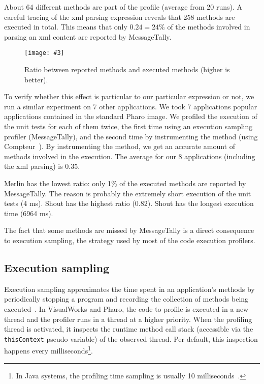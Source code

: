 \documentclass{sig-alternate}
\newcommand{\ct}{\lstinline[backgroundcolor=\color{white},basicstyle=\footnotesize\ttfamily]}
\newcommand{\fig}[4]{
	\begin{figure}[#1]
		\centering
		\texttt{[image: \#3]}
		\caption{\label{fig:#3}#4}
	\end{figure}}
\begin{document}
About 64 different methods are part of the profile (average from 20 runs). A careful tracing of the xml parsing expression reveals that 258 methods are executed in total. This means that only $0.24 = 24\%$ of the methods involved in parsing an xml content are reported by MessageTally. 

		

\fig{h}{0.5}{Ratio}{Ratio between reported methods and executed methods (higher is better).}

To verify whether this effect is particular to our particular expression or not, we run a similar experiment on 7 other applications.
We took 7 applications popular applications contained in the standard Pharo image. We profiled the execution of the unit tests for each of them twice, the first time using an execution sampling profiler (MessageTally), and the second time by instrumenting the method (using Compteur~\cite{Berg11d}).
By instrumenting the method, we get an accurate amount of methods involved in the execution. The average for our 8 applications (including the xml parsing) is 0.35. 

Merlin has the lowest ratio: only 1\% of the executed methods are reported by MessageTally. The reason is probably the extremely short execution of the unit tests (4 ms). Shout has the highest ratio (0.82). Shout has the longest execution time (6964 ms). 

The fact that some methods are missed by MessageTally is a direct consequence to execution sampling, the strategy used by most of the code execution profilers.


\subsection{Execution sampling}
Execution sampling approximates the time spent in an application's methods by periodically stopping a program and recording the collection of methods being executed~\cite{Berg11d}. In VisualWorks and Pharo, the code to profile is executed in a new thread and the profiler runs in a thread at a higher priority. 
When the profiling thread is activated, it inspects the runtime method call stack (accessible via the \ct{thisContext} pseudo variable) of the observed thread. Per default, this inspection happens every milliseconds\footnote{In Java systems, the profiling time sampling is usually 10 milliseconds~\cite{Mytk10a}.}. 
\end{document}
